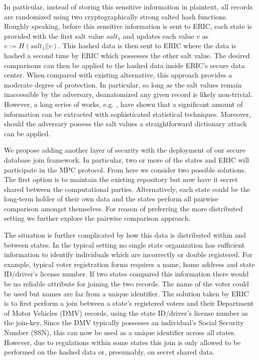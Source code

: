 In particular, instead of storing this sensitive information in plaintext, all records are randomized using two cryptographically strong salted hash functions. Roughly speaking, before this sensitive information is sent to ERIC, each state is provided with the first salt value $salt_1$ and updates each value $v$ as $v := H(salt_1 || v)$. This hashed data is then sent to ERIC where the data is hashed a second time by ERIC which possesses the other salt value. The desired comparisons can then be applied to the hashed data inside ERIC's secure data center. When compared with existing alternative, this approach provides a moderate degree of protection. In particular, so long as the salt values remain inaccessible by the adversary, deanatomized any given record is likely non-trivial. However, a long series of works, e.g. \cite{deanon0,deanon1,deanon2,deanon3,deanon4}, have shown that a significant amount of information can be extracted with sophisticated statistical techniques. Moreover, should the adversary possess the salt values a straightforward dictionary attack can be applied.

We propose adding another layer of security with the deployment of our secure database join framework. In particular, two or more of the states and ERIC will participate in the MPC protocol. From here we consider two possible solutions. The first option is to maintain the existing repository but now have it secret shared between the computational parties. Alternatively, each state could be the long-term holder of their own data and the states perform all pairwise comparison amongst themselves. For reason of preferring the more distributed setting we further explore the pairwise comparison approach. 

The situation is further complicated by how this data is distributed within and between states. In the typical setting no single state organization has sufficient information to identify individuals which are incorrectly or double registered. For example, typical voter registration forms requires a name, home address and state ID/driver's license number. If two states compared this information there would be no reliable attribute for joining the two records. The name of the voter could be used but names are far from a unique identifier. The solution taken by ERIC is to first perform a join between a state's registered voters and their Department of Motor Vehicles (DMV) records, using the  state ID/driver's license number as the join-key. Since the DMV typically possesses an individual's Social Security Number (SSN), this can now be used as a unique identifier across all states. However, due to regulations within some states this join is only allowed to be performed on the hashed data or, presumably, on secret shared data.

